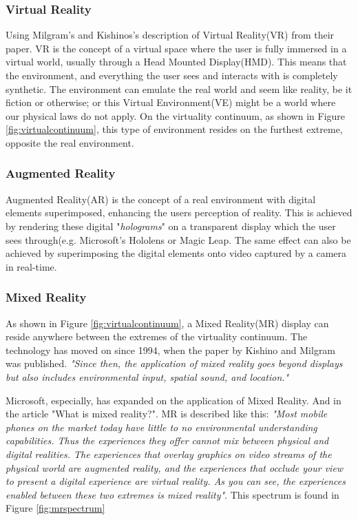         \subsubsection{Virtual Reality}
            Using Milgram's and Kishinos's description of Virtual Reality(VR) from their paper.\cite{Milgram1994} VR is the concept of a virtual space where the user is fully immersed in a virtual world, usually through a Head Mounted Display(HMD). This means that the environment, and everything the user sees and interacts with is completely synthetic. The environment can emulate the real world and seem like reality, be it fiction or otherwise; or this Virtual Environment(VE) might be a world where our physical laws do not apply. On the virtuality continuum, as shown in Figure \ref{fig:virtualcontinuum}, this type of environment resides on the furthest extreme, opposite the real environment.
    
        \subsubsection{Augmented Reality}
            Augmented Reality(AR) is the concept of a real environment with digital elements superimposed, enhancing the users perception of reality.\cite{Milgram1994} This is achieved by rendering these digital "\emph{holograms}" on a transparent display which the user sees through(e.g. Microsoft's Hololens\cite{hololens} or Magic Leap\cite{magicleap}. The same effect can also be achieved by superimposing the digital elements onto video captured by a camera in real-time.
        
        \subsubsection{Mixed Reality}
            As shown in Figure \ref{fig:virtualcontinuum}, a Mixed Reality(MR) display can reside anywhere between the extremes of the virtuality continuum\cite{Milgram1994}. The technology has moved on since 1994, when the paper by Kishino and Milgram was published. \emph{"Since then, the application of mixed reality goes beyond displays but also includes environmental input, spatial sound, and location."}\cite{wdc-mr}
            
            Microsoft, especially, has expanded on the application of Mixed Reality. And in the article "What is mixed reality?"\cite{wdc-mr}. MR is described like this: \emph{"Most mobile phones on the market today have little to no environmental understanding capabilities. Thus the experiences they offer cannot mix between physical and digital realities. The experiences that overlay graphics on video streams of the physical world are augmented reality, and the experiences that occlude your view to present a digital experience are virtual reality. As you can see, the experiences enabled between these two extremes is mixed reality"}\cite{wdc-mr}. This spectrum is found in Figure \ref{fig:mrspectrum}
            
